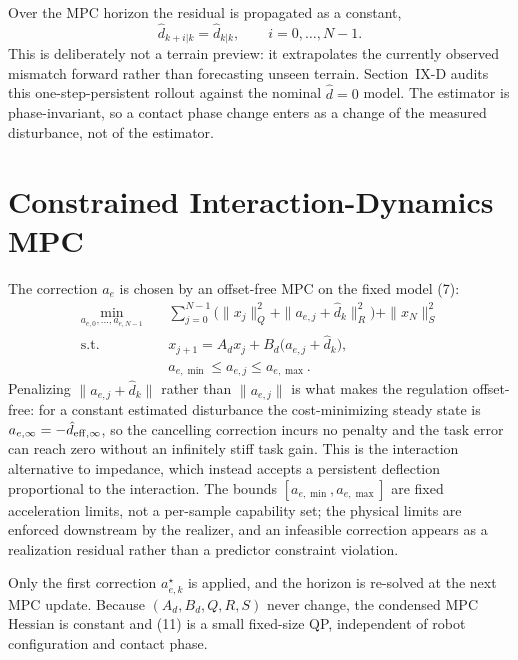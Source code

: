 \documentclass[journal]{IEEEtran}
\theoremstyle{plain}
\theoremstyle{definition}
\theoremstyle{remark}
\begin{document}
Over the MPC horizon the residual is propagated as a constant,
\begin{equation}
\hat d_{k+i|k}=\hat d_{k|k},\qquad i=0,\dots,N-1 .
\tag{10}
\end{equation}
This is deliberately not a terrain preview: it extrapolates the currently observed mismatch forward rather than forecasting unseen terrain. Section~IX-D audits this one-step-persistent rollout against the nominal $\hat d=0$ model. The estimator is phase-invariant, so a contact phase change enters as a change of the measured disturbance, not of the estimator.

\section{Constrained Interaction-Dynamics MPC}\label{sec:mpc}

The correction $a_e$ is chosen by an offset-free MPC on the fixed model (7):
\begin{equation}
\begin{aligned}
\min_{a_{e,0},\dots,a_{e,N-1}}\quad&
\sum_{j=0}^{N-1}\Big(\|x_j\|_Q^2+\|a_{e,j}+\hat d_k\|_R^2\Big)+\|x_N\|_S^2\\
\text{s.t.}\quad&
x_{j+1}=A_dx_j+B_d\big(a_{e,j}+\hat d_k\big),\\
&a_{e,\min}\le a_{e,j}\le a_{e,\max}.
\end{aligned}
\tag{11}
\end{equation}
Penalizing $\|a_{e,j}+\hat d_k\|$ rather than $\|a_{e,j}\|$ is what makes the regulation offset-free: for a constant estimated disturbance the cost-minimizing steady state is $a_{e,\infty}=-\hat d_{{\rm eff},\infty}$, so the cancelling correction incurs no penalty and the task error can reach zero without an infinitely stiff task gain. This is the interaction alternative to impedance, which instead accepts a persistent deflection proportional to the interaction. The bounds $[a_{e,\min},a_{e,\max}]$ are fixed acceleration limits, not a per-sample capability set; the physical limits are enforced downstream by the realizer, and an infeasible correction appears as a realization residual rather than a predictor constraint violation.

Only the first correction $a_{e,k}^\star$ is applied, and the horizon is re-solved at the next MPC update. Because $(A_d,B_d,Q,R,S)$ never change, the condensed MPC Hessian is constant and (11) is a small fixed-size QP, independent of robot configuration and contact phase.
\end{document}
